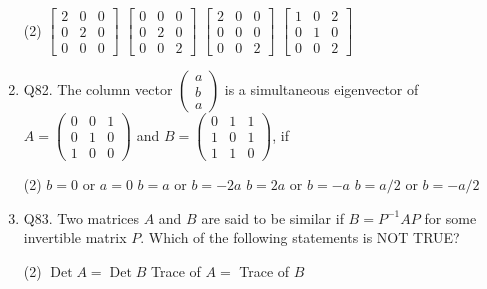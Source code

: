 \begin{enumerate}
\begin{tasks}(2)
     	\task[\textbf{a.}] $\left[\begin{array}{lll}2 & 0 & 0 \\ 0 & 2 & 0 \\ 0 & 0 & 0\end{array}\right]$
     	\task[\textbf{b.}]$\left[\begin{array}{lll}0 & 0 & 0 \\ 0 & 2 & 0 \\ 0 & 0 & 2\end{array}\right]$
     	\task[\textbf{c.}] $\left[\begin{array}{lll}2 & 0 & 0 \\ 0 & 0 & 0 \\ 0 & 0 & 2\end{array}\right]$
     	\task[\textbf{d.}] $\left[\begin{array}{lll}1 & 0 & 2 \\ 0 & 1 & 0 \\ 0 & 0 & 2\end{array}\right]$
     \end{tasks}
\item    Q82. The column vector $\left(\begin{array}{l}a \\ b \\ a\end{array}\right)$ is a simultaneous eigenvector of
$A=\left(\begin{array}{lll}0 & 0 & 1 \\ 0 & 1 & 0 \\ 1 & 0 & 0\end{array}\right)$ and $B=\left(\begin{array}{lll}0 & 1 & 1 \\ 1 & 0 & 1 \\ 1 & 1 & 0\end{array}\right)$, if  
 \begin{tasks}(2)
	\task[\textbf{a.}]$b=0$ or $a=0$
	\task[\textbf{b.}]$b=a$ or $b=-2 a$
	\task[\textbf{c.}]$b=2 a$ or $b=-a$
	\task[\textbf{d.}] $b=a / 2$ or $b=-a / 2$
\end{tasks}
\item Q83. Two matrices $A$ and $B$ are said to be similar if $B=P^{-1} A P$ for some invertible matrix $P$. Which of the following statements is NOT TRUE?
   \begin{tasks}(2)
  	\task[\textbf{a.}] $\operatorname{Det} A=\operatorname{Det} B$
  	\task[\textbf{b.}] Trace of $A=$ Trace of $B$

\end{tasks}
\end{enumerate}

